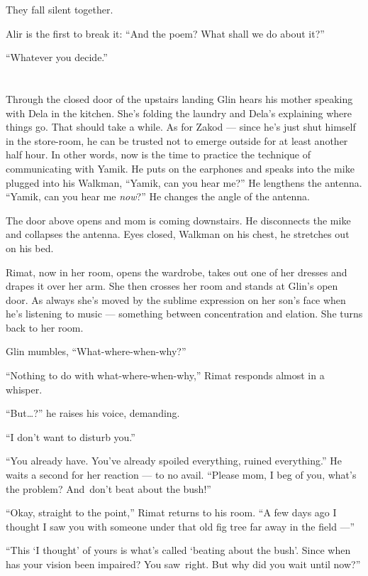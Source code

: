 \documentclass[twoside,11pt]{book}
\begin{document}
They fall silent together.

Alir is the first to break it: ``And the poem? What shall we do about it?''

``Whatever you decide.''


\chapter{}

Through the closed door of the upstairs landing Glin hears his mother speaking with Dela in the kitchen.  She's
folding the laundry and Dela's explaining where things go. That should take a while. As for Zakod --- since he's just
shut himself in the store-room, he can be trusted not to emerge outside for at least another half hour. In other words,
now is the time to practice the technique of communicating with Yamik. He puts on the earphones and speaks into the
mike plugged into his Walkman, ``Yamik, can you hear me?'' He lengthens the antenna.
``Yamik, can you hear me \textit{now}?'' He changes the angle of the antenna.

The door above opens and mom is coming downstairs. He disconnects the mike and collapses{ }the antenna.
Eyes closed, Walkman on his chest, he stretches out on his bed.

Rimat, now in her room, opens the wardrobe, takes out one of her dresses and drapes it over her arm. She then crosses
her room and stands at Glin's open door. As always she's moved by the sublime expression on her son's face when he's
listening to music --- something between concentration and elation. She turns back to her room.

Glin mumbles, ``What-where-when-why?''

``Nothing to do with what-where-when-why,'' Rimat responds almost in a whisper.

``But{\ldots}?'' he raises his voice, demanding.

``I don't want to disturb you.''

``You already have. You've already spoiled everything, ruined everything.'' He waits a second
for her reaction --- to no avail. ``Please mom, I beg of you, what's   the problem?  And~don't beat
about the bush!''

``Okay, straight to the point,'' Rimat returns to his room. ``A few days ago I
thought I saw you with someone under that old fig tree far away in the field ---''

``This `I thought' of yours is what's called `beating about the bush'. Since when has your vision been
impaired? You saw~right. But why did you wait until now?''
\end{document}
